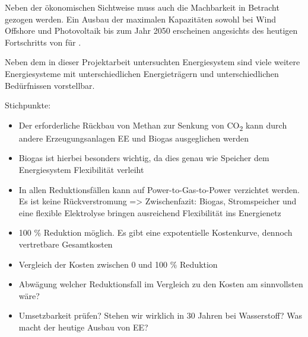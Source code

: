 Neben der ökonomischen Sichtweise muss auch die Machbarkeit in Betracht gezogen werden.
Ein Ausbau der maximalen Kapazitäten sowohl bei Wind Offshore und Photovoltaik bis zum Jahr 2050 erscheinen angesichts des heutigen Fortschritts von  für .

Neben dem in dieser Projektarbeit untersuchten Energiesystem sind viele weitere Energiesysteme mit unterschiedlichen Energieträgern und unterschiedlichen Bedürfnissen vorstellbar. 

Stichpunkte:
\begin{itemize}
  \item Der erforderliche Rückbau von Methan zur Senkung von CO\textsubscript{2} kann durch andere Erzeugungsanlagen EE und Biogas ausgeglichen werden
  \item Biogas ist hierbei besonders wichtig, da dies genau wie Speicher dem Energiesystem Flexibilität verleiht
  \item In allen Reduktionsfällen kann auf Power-to-Gas-to-Power verzichtet werden. Es ist keine Rückverstromung => Zwischenfazit: Biogas, Stromspeicher und eine flexible Elektrolyse bringen ausreichend Flexibilität ins Energienetz
  \item 100 \% Reduktion möglich. Es gibt eine expotentielle Kostenkurve, dennoch vertretbare Gesamtkosten
  \item Vergleich der Kosten zwischen 0 und 100 \% Reduktion 
  \item Abwägung welcher Reduktionsfall im Vergleich zu den Kosten am sinnvollsten wäre?
  \item Umsetzbarkeit prüfen? Stehen wir wirklich in 30 Jahren bei Wasserstoff? Was macht der heutige Ausbau von EE? 
\end{itemize}



